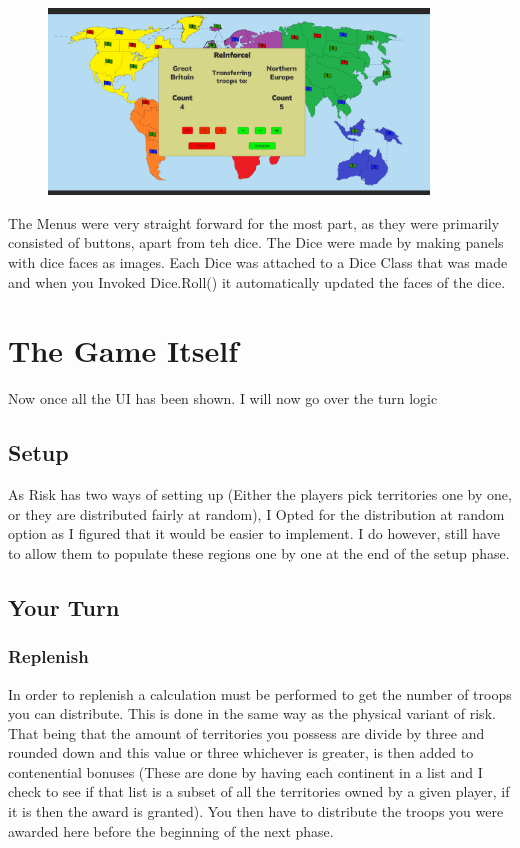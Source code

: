 \documentclass{article}
\begin{document}
\begin{figure}[h!]
			\begin{minipage}[c]{0.5\textwidth}
				\includegraphics[width=0.9\textwidth]{prog4.png}
			\end{minipage}
		\end{figure}
		The Menus were very straight forward for the most part, as they were primarily consisted of buttons, apart from teh dice. The Dice were made by making panels with dice faces as images. Each Dice was attached to a Dice Class that was made and when you Invoked Dice.Roll() it automatically updated the faces of the dice.
	\section{The Game Itself}
	Now once all the UI has been shown. I will now go over the turn logic
	\subsection{Setup}
		As Risk has two ways of setting up (Either the players pick territories one by one, or they are distributed fairly at random), I Opted for the distribution at random option as I figured that it would be easier to implement.
		I do however, still have to allow them to populate these regions one by one at the end of the setup phase.
	\subsection{Your Turn}
		\subsubsection{Replenish}
			In order to replenish a calculation must be performed to get the number of troops you can distribute. This is done in the same way as the physical variant of risk. That being that the amount of territories you possess are divide by three and rounded down and this value or three whichever is greater, is then added to contenential bonuses (These are done by having each continent in a list and I check to see if that list is a subset of all the territories owned by a given player, if it is then the award is granted). You then have to distribute the troops you were awarded here before the beginning of the next phase.
\end{document}
